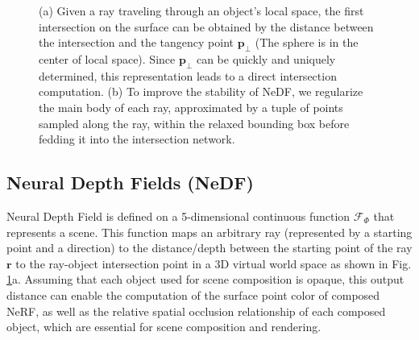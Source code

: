 \documentclass[letterpaper]{article} %
\begin{document}
\begin{figure}[tbp]
  \centering
  \caption{(a) Given a ray traveling through an object's local space, the first intersection on the surface can be obtained by the distance between the intersection and the tangency point $\mathbf{p}_{\perp}$ (The sphere is in the center of local space).
  Since $\mathbf{p}_{\perp}$ can be quickly and uniquely determined, this representation leads to a direct intersection computation. (b) To improve the stability of NeDF, we regularize the main body of each ray, approximated by a tuple of points sampled along the ray, within the relaxed bounding box
  before fedding it into the intersection network.
  }
  \label{fig:rep_ray}
\end{figure}

\subsection{Neural Depth Fields (NeDF)}
 Neural Depth Field is defined on a 5-dimensional continuous function $\mathcal{F}_{\Phi}$ that represents a scene. This function maps an arbitrary ray (represented by a starting point and a direction) to the distance/depth between the starting point of the ray $\mathbf{r}$ to the ray-object intersection point in a 3D virtual world space as shown in Fig. \ref{fig:rep_ray}a. Assuming that each object used for scene composition is opaque, this output distance can enable the computation of the surface point color of composed NeRF, as well as the relative spatial occlusion relationship of each composed object, which are essential for scene composition and rendering.
\end{document}
